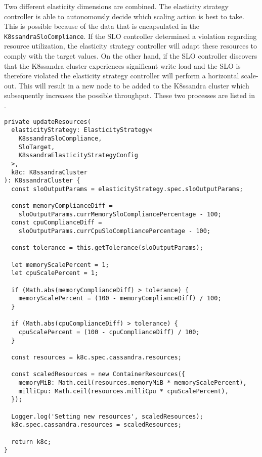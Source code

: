 Two different elasticity dimensions are combined. The elasticity strategy controller is able to autonomously decide which scaling action is best to take. This is possible because of the data that is encapsulated in the \texttt{K8\-ssan\-dra\-Slo\-Compliance}. If the SLO controller determined a violation regarding resource utilization, the elasticity strategy controller will adapt these resources to comply with the target values. On the other hand, if the SLO controller discovers that the K8ssandra cluster experiences significant write load and the SLO is therefore violated the elasticity strategy controller will perform a horizontal scale-out. This will result in a new node to be added to the K8ssandra cluster which subsequently increases the possible throughput. These two processes are listed in .


\begin{lstlisting}[caption={Method of diagonal elasticity strategy controller which manages vertical scaling},
                    captionpos=b,
                    label=lst:diagonal-elasticity:updateResources,
                    float]
private updateResources(
  elasticityStrategy: ElasticityStrategy<
    K8ssandraSloCompliance,
    SloTarget,
    K8ssandraElasticityStrategyConfig
  >,
  k8c: K8ssandraCluster
): K8ssandraCluster {
  const sloOutputParams = elasticityStrategy.spec.sloOutputParams;

  const memoryComplianceDiff =
    sloOutputParams.currMemorySloCompliancePercentage - 100;
  const cpuComplianceDiff =
    sloOutputParams.currCpuSloCompliancePercentage - 100;

  const tolerance = this.getTolerance(sloOutputParams);

  let memoryScalePercent = 1;
  let cpuScalePercent = 1;

  if (Math.abs(memoryComplianceDiff) > tolerance) {
    memoryScalePercent = (100 - memoryComplianceDiff) / 100;
  }

  if (Math.abs(cpuComplianceDiff) > tolerance) {
    cpuScalePercent = (100 - cpuComplianceDiff) / 100;
  }

  const resources = k8c.spec.cassandra.resources;

  const scaledResources = new ContainerResources({
    memoryMiB: Math.ceil(resources.memoryMiB * memoryScalePercent),
    milliCpu: Math.ceil(resources.milliCpu * cpuScalePercent),
  });

  Logger.log('Setting new resources', scaledResources);
  k8c.spec.cassandra.resources = scaledResources;

  return k8c;
}
\end{lstlisting}

